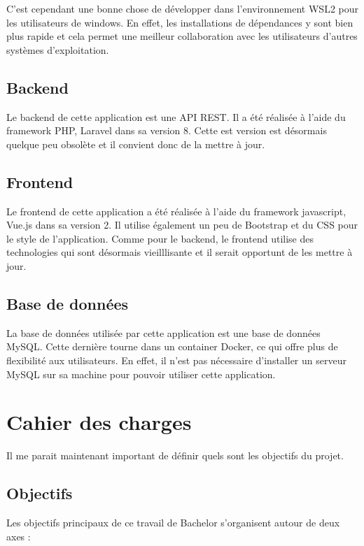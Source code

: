 C'est cependant une bonne chose de développer dans l'environnement WSL2 pour les utilisateurs de windows. En effet, les installations de dépendances y sont bien plus rapide et cela permet une meilleur collaboration avec les utilisateurs d'autres systèmes d'exploitation.

\subsection{Backend}
Le backend de cette application est une API REST. Il a été réalisée à l'aide du framework PHP, Laravel dans sa version 8. Cette est version est désormais quelque peu obsolète et il convient donc de la mettre à jour.

\subsection{Frontend}
Le frontend de cette application a été réalisée à l'aide du framework javascript, Vue.js dans sa version 2. Il utilise également un peu de Bootstrap et du CSS pour le style de l'application. Comme pour le backend, le frontend utilise des technologies qui sont désormais vieilllisante et il serait opportunt de les mettre à jour.

\subsection{Base de données}
La base de données utilisée par cette application est une base de données MySQL. Cette dernière tourne dans un container Docker, ce qui offre plus de flexibilité aux utilisateurs. En effet, il n'est pas nécessaire d'installer un serveur MySQL sur sa machine pour pouvoir utiliser cette application.

\section{Cahier des charges}
Il me parait maintenant important de définir quels sont les objectifs du projet.

\subsection{Objectifs}
Les objectifs principaux de ce travail de Bachelor s'organisent autour de deux axes :

